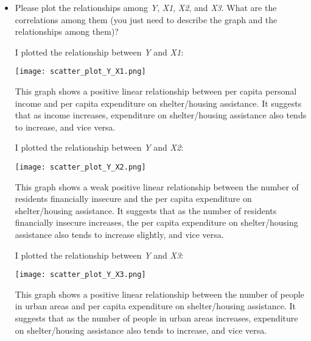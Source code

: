 \documentclass[12pt,letterpaper]{article}
\begin{document}
	\begin{itemize}
		\item Please plot the relationships among \emph{Y}, \emph{X1}, \emph{X2}, and \emph{X3}. What are the correlations among them (you just need to describe the graph and the relationships among them)?
		
		I plotted the relationship between \emph{Y} and \emph{X1}:
		
		
		\texttt{[image: scatter\_plot\_Y\_X1.png]}
		
		This graph shows a positive linear relationship between per capita personal income and per capita expenditure on shelter/housing assistance. It suggests that as income increases, expenditure on shelter/housing assistance also tends to increase, and vice versa. 
		
		\newpage
		
		I plotted the relationship between \emph{Y} and \emph{X2}:
		
		
		
		\texttt{[image: scatter\_plot\_Y\_X2.png]}
		
		This graph shows a weak positive linear relationship between the number of residents financially insecure and the per capita expenditure on shelter/housing assistance.  It suggests that as the number of residents financially insecure increases, the per capita expenditure on shelter/housing assistance also tends to increase slightly, and vice versa. 
		 
		\newpage
		
		I plotted the relationship between \emph{Y} and \emph{X3}:
		
		
		\texttt{[image: scatter\_plot\_Y\_X3.png]}
		
		This graph shows a positive linear relationship between the number of people in urban areas and per capita expenditure on shelter/housing assistance. It suggests that as the number of people in urban areas increases, expenditure on shelter/housing assistance also tends to increase, and vice versa.
		

\end{itemize}
\end{document}
